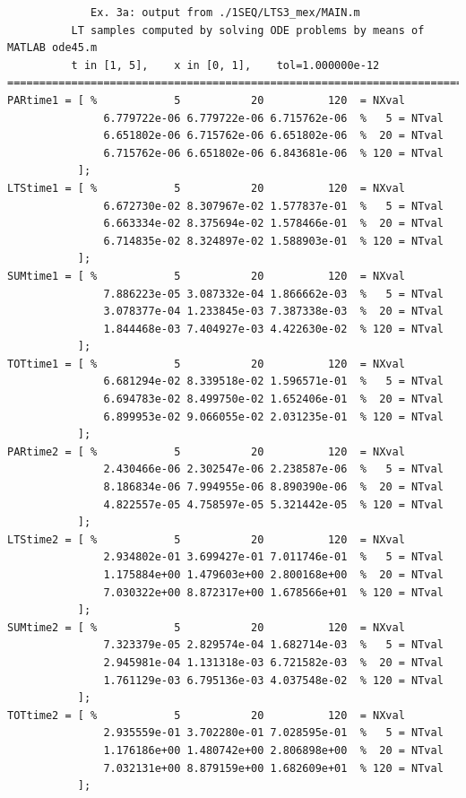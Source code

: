 \documentclass[a4paper,10pt]{report}%
\begin{document}
\begin{lstlisting}
             Ex. 3a: output from ./1SEQ/LTS3_mex/MAIN.m
          LT samples computed by solving ODE problems by means of MATLAB ode45.m
          t in [1, 5],    x in [0, 1],    tol=1.000000e-12
====================================================================================
PARtime1 = [ %            5           20          120  = NXval
               6.779722e-06 6.779722e-06 6.715762e-06  %   5 = NTval
               6.651802e-06 6.715762e-06 6.651802e-06  %  20 = NTval
               6.715762e-06 6.651802e-06 6.843681e-06  % 120 = NTval
           ];
LTStime1 = [ %            5           20          120  = NXval
               6.672730e-02 8.307967e-02 1.577837e-01  %   5 = NTval
               6.663334e-02 8.375694e-02 1.578466e-01  %  20 = NTval
               6.714835e-02 8.324897e-02 1.588903e-01  % 120 = NTval
           ];
SUMtime1 = [ %            5           20          120  = NXval
               7.886223e-05 3.087332e-04 1.866662e-03  %   5 = NTval
               3.078377e-04 1.233845e-03 7.387338e-03  %  20 = NTval
               1.844468e-03 7.404927e-03 4.422630e-02  % 120 = NTval
           ];
TOTtime1 = [ %            5           20          120  = NXval
               6.681294e-02 8.339518e-02 1.596571e-01  %   5 = NTval
               6.694783e-02 8.499750e-02 1.652406e-01  %  20 = NTval
               6.899953e-02 9.066055e-02 2.031235e-01  % 120 = NTval
           ];
PARtime2 = [ %            5           20          120  = NXval
               2.430466e-06 2.302547e-06 2.238587e-06  %   5 = NTval
               8.186834e-06 7.994955e-06 8.890390e-06  %  20 = NTval
               4.822557e-05 4.758597e-05 5.321442e-05  % 120 = NTval
           ];
LTStime2 = [ %            5           20          120  = NXval
               2.934802e-01 3.699427e-01 7.011746e-01  %   5 = NTval
               1.175884e+00 1.479603e+00 2.800168e+00  %  20 = NTval
               7.030322e+00 8.872317e+00 1.678566e+01  % 120 = NTval
           ];
SUMtime2 = [ %            5           20          120  = NXval
               7.323379e-05 2.829574e-04 1.682714e-03  %   5 = NTval
               2.945981e-04 1.131318e-03 6.721582e-03  %  20 = NTval
               1.761129e-03 6.795136e-03 4.037548e-02  % 120 = NTval
           ];
TOTtime2 = [ %            5           20          120  = NXval
               2.935559e-01 3.702280e-01 7.028595e-01  %   5 = NTval
               1.176186e+00 1.480742e+00 2.806898e+00  %  20 = NTval
               7.032131e+00 8.879159e+00 1.682609e+01  % 120 = NTval
           ];
\end{lstlisting}
\end{document}

